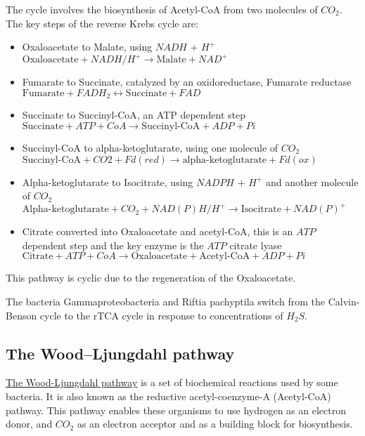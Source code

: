 \documentclass[a4paper,14pt]{extarticle}
\begin{document}
The cycle involves the biosynthesis of Acetyl-CoA from two molecules of $CO_2$. The key
steps of the reverse Krebs cycle are:

\begin{itemize}

    \item Oxaloacetate to Malate, using $NADH$ + $H^+$\\
        $\text{Oxaloacetate} + NADH / H^+ \rightarrow \text{Malate} + NAD^+$
    \item Fumarate to Succinate, catalyzed by an oxidoreductase, Fumarate
        reductase\\
        $\text{Fumarate} + FADH_2 \leftrightarrow \text{Succinate} + FAD$
    \item Succinate to Succinyl-CoA, an ATP dependent step\\
        $\text{Succinate} + ATP + CoA \rightarrow \text{Succinyl-CoA} + ADP + Pi$
    \item Succinyl-CoA to alpha-ketoglutarate, using one molecule of $CO_2$\\
        $\text{Succinyl-CoA} + CO2 + Fd{(red)} \rightarrow \text{alpha-ketoglutarate} + Fd{(ox)}$
    \item Alpha-ketoglutarate to Isocitrate, using $NADPH$ + $H^+$ and another molecule of
        $CO_2$\\
        $\text{Alpha-ketoglutarate} + CO_2 + NAD(P)H/H^+ \rightarrow \text{Isocitrate} + NAD{(P)}^+$
    \item Citrate converted into Oxaloacetate and acetyl-CoA, this is an $\mathit{ATP}$
        dependent step and the key enzyme is the $\mathit{ATP}$ citrate lyase\\
        $\text{Citrate} + ATP + CoA \rightarrow \text{Oxaloacetate} + \text{Acetyl-CoA} + ADP + Pi$
\end{itemize}

This pathway is cyclic due to the regeneration of the Oxaloacetate.

The bacteria Gammaproteobacteria and Riftia pachyptila switch from the Calvin-Benson cycle
to the rTCA cycle in response to concentrations of $H_2S$.

\subsection{The Wood–Ljungdahl pathway}
\href{https://en.wikipedia.org/wiki/Wood-Ljungdahl_pathway}{The Wood-Ljungdahl pathway} is
a set of biochemical reactions used by some bacteria. It is
also known as the reductive acetyl-coenzyme-A (Acetyl-CoA) pathway. This pathway
enables these organisms to use hydrogen as an electron donor, and $CO_2$ as an
electron acceptor and as a building block for biosynthesis.
\end{document}

